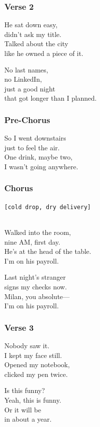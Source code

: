 \subsubsection{Verse 2}\label{verse-2-16}

He sat down easy,\\
didn't ask my title.\\
Talked about the city\\
like he owned a piece of it.

No last names,\\
no LinkedIn,\\
just a good night\\
that got longer than I planned.

\subsubsection{Pre-Chorus}\label{pre-chorus-38}

So I went downstairs\\
just to feel the air.\\
One drink, maybe two,\\
I wasn't going anywhere.

\subsubsection{Chorus}\label{chorus-52}

\texttt{{[}cold\ drop,\ dry\ delivery{]}}\strut \\
Walked into the room,\\
nine AM, first day.\\
He's at the head of the table.\\
I'm on his payroll.

Last night's stranger\\
signs my checks now.\\
Milan, you absolute---\\
I'm on his payroll.

\subsubsection{Verse 3}\label{verse-3-12}

Nobody saw it.\\
I kept my face still.\\
Opened my notebook,\\
clicked my pen twice.

Is this funny?\\
Yeah, this is funny.\\
Or it will be\\
in about a year.

